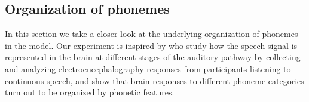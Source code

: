 \subsection{Organization of phonemes}
\label{sec:organization}

In this section we take a closer look at the underlying organization
of phonemes in the model.  Our experiment is inspired by 
\citet{khalighinejad2017dynamic} who study how
the speech signal is represented in the brain at different stages of
the auditory pathway by collecting and analyzing electroencephalography 
responses from participants listening to continuous speech, and show that brain
responses to different phoneme categories turn out to be organized by
phonetic features. 

%


